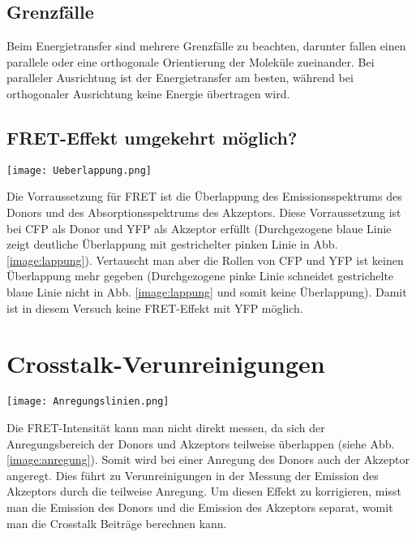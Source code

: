 \subsection*{Grenzfälle}
Beim Energietransfer sind mehrere Grenzfälle zu beachten, darunter fallen einen parallele oder eine orthogonale Orientierung der Moleküle zueinander. Bei paralleler Ausrichtung ist der Energietransfer am besten, während bei orthogonaler Ausrichtung keine Energie übertragen wird.
\subsection*{FRET-Effekt umgekehrt möglich?}
\begin{center}
    \texttt{[image: Ueberlappung.png]}
    \label{image:lappung}
\end{center}
Die Vorraussetzung für FRET ist die Überlappung des Emissionsspektrums des Donors und des Absorptionsspektrums des Akzeptors. Diese Vorraussetzung ist bei CFP als Donor und YFP als Akzeptor erfüllt (Durchgezogene blaue Linie zeigt deutliche Überlappung mit gestrichelter pinken Linie in Abb. \ref{image:lappung}). Vertauscht man aber die Rollen von CFP und YFP ist keinen Überlappung mehr gegeben (Durchgezogene pinke Linie schneidet gestrichelte blaue Linie nicht in Abb. \ref{image:lappung} und somit keine Überlappung). Damit ist in diesem Versuch keine FRET-Effekt mit YFP möglich.
\section{Crosstalk-Verunreinigungen}
\label{sec:verunreinigung}
\begin{center}
    \texttt{[image: Anregungslinien.png]}
    \label{image:anregung}
\end{center}
Die FRET-Intensität kann man nicht direkt messen, da sich der Anregungsbereich der Donors und Akzeptors teilweise überlappen (siehe Abb. \ref{image:anregung}). Somit wird bei einer Anregung des Donors auch der Akzeptor angeregt. Dies führt zu Verunreinigungen in der Messung der Emission des Akzeptors durch die teilweise Anregung. Um diesen Effekt zu korrigieren, misst man die Emission des Donors und die Emission des Akzeptors separat, womit man die Crosstalk Beiträge berechnen kann.
